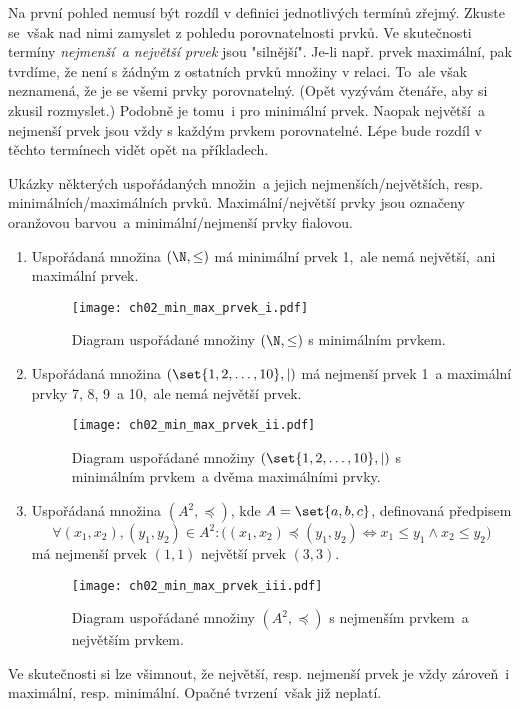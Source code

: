 Na první pohled nemusí být rozdíl v definici jednotlivých termínů zřejmý. Zkuste se~však nad nimi zamyslet z pohledu porovnatelnosti prvků. Ve skutečnosti termíny \emph{nejmenší~a největší prvek} jsou "silnější". Je-li např. prvek maximální, pak tvrdíme, že není s žádným z ostatních prvků množiny v relaci. To~ale však neznamená, že je se všemi prvky porovnatelný. (Opět vyzývám čtenáře, aby si zkusil rozmyslet.) Podobně je tomu~i pro minimální prvek. Naopak největší~a nejmenší prvek jsou vždy s každým prvkem porovnatelné. Lépe bude rozdíl v těchto termínech vidět opět na příkladech.
\begin{example}\label{ex:min_max_prvek}
    \sloppy Ukázky některých uspořádaných množin~a jejich nejmenších/největších, resp. minimálních/maximálních prvků. Maximální/největší prvky jsou označeny oranžovou barvou~a minimální/nejmenší prvky fialovou. 
    \begin{enumerate}[label=(\roman*)]
        \item\label{item:min_max_prvek_i} Uspořádaná množina $(\N,\leq)$ má minimální prvek 1,~ale nemá největší,~ani maximální prvek.
        \begin{figure}[H]
            \centering
            \texttt{[image: ch02\_min\_max\_prvek\_i.pdf]}
            \caption{Diagram uspořádané množiny $(\N,\leq)$ s minimálním prvkem.}
            \label{fig:min_max_prvek_i}
        \end{figure}
        \item\label{item:min_max_prvek_ii} Uspořádaná množina $(\set{1,2,\dots,10},\mid)$ má nejmenší prvek 1~a maximální prvky 7, 8, 9~a 10,~ale nemá největší prvek.
        \begin{figure}[H]
            \centering
            \texttt{[image: ch02\_min\_max\_prvek\_ii.pdf]}
            \caption{Diagram uspořádané množiny $(\set{1,2,\dots,10},\mid)$ s minimálním prvkem~a dvěma maximálními prvky.}
            \label{fig:min_max_prvek_ii}
        \end{figure}
        \item\label{item:min_max_prvek_iii} Uspořádaná množina $(A^2,\preceq)$, kde $A=\set{a,b,c}$, definovaná předpisem
        \begin{equation*}
            \forall (x_1,x_2),(y_1,y_2)\in A^2: \bigl((x_1,x_2)\preceq (y_1,y_2) \iff x_1\leq y_1 \land x_2\leq y_2\bigr)
        \end{equation*}
        má nejmenší prvek $(1,1)$ největší prvek $(3,3)$.
        \begin{figure}[H]
            \centering
            \texttt{[image: ch02\_min\_max\_prvek\_iii.pdf]}
            \caption{Diagram uspořádané množiny $(A^2,\preceq)$ s nejmenším prvkem~a největším prvkem.}
            \label{fig:min_max_prvek_iii}
        \end{figure}
    \end{enumerate}
\end{example}
Ve skutečnosti si lze všimnout, že největší, resp. nejmenší prvek je vždy zároveň~i maximální, resp. minimální. Opačné tvrzení~však již neplatí.